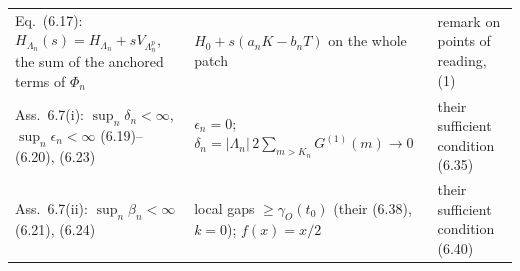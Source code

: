 \documentclass[aps,prx,onecolumn,10pt,nofootinbib,longbibliography,floatfix]{revtex4-2}
\theoremstyle{remark}
\begin{document}
\begin{table}[h]
\begin{tabular}{p{}p{}p{}}
Eq.~(6.17): $H_{\Lambda_n}(s)=H_{\Lambda_n}+sV_{\Lambda^p_n}$, the sum of the anchored terms of $\Phi_n$ & $H_0+s(a_nK-b_nT)$ on the whole patch & remark on points of reading, (1)\\ %
Ass.~6.7(i): $\sup_n\delta_n<\infty$, $\sup_n\epsilon_n<\infty$ (6.19)--(6.20), (6.23) & $\epsilon_n=0$; $\delta_n=|\Lambda_n|\,2\sum_{m>K_n}G^{(1)}(m)\to0$ & their sufficient condition (6.35)\\ %
Ass.~6.7(ii): $\sup_n\beta_n<\infty$ (6.21), (6.24) & local gaps $\ge\gamma_O(t_0)$ (their (6.38), $k=0$); $f(x)=x/2$ & their sufficient condition (6.40)\\ %
\end{tabular}
\end{table}
\end{document}
